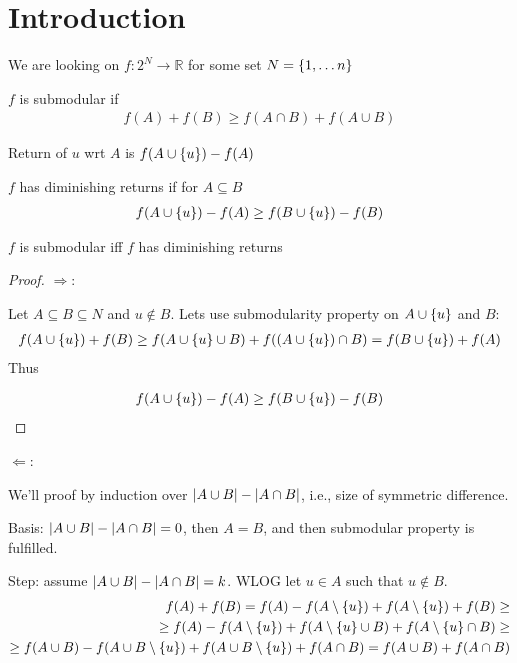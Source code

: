 \section{Introduction}
We are looking on $f: 2^N \to \mathbb{R}$ for some set $N = \qty{1, \dots n }$
\begin{definition}
	$f$ is submodular if 
	\begin{align}
	f(A)+f(B) \geq f(A\cap B) + f(A\cup B)
	\end{align}
\end{definition}

\begin{definition}
	Return of $u$ wrt $A$ is $f(A \cup \qty{u }) - f(A)$
	
\end{definition}
\begin{definition}
$f$ has diminishing returns if for $A\subseteq B$
\begin{align}
f(A \cup \qty{u }) - f(A) \geq f(B \cup \qty{u }) - f(B)
\end{align}
\end{definition}

\begin{prop}
	$f$ is submodular iff $f$ has diminishing returns
	\begin{proof}
		$\Rightarrow$:
		
		Let $A\subseteq B \subseteq N$ and $u\notin B$. Lets use submodularity property on $A\cup \qty{ u }$ and $B$:
		\begin{align}
		f(A\cup \qty{ u }) + f(B) \geq f\qty(A\cup \qty{ u } \cup B) + f\qty((A\cup \qty{ u }) \cap B)  = f\qty(B\cup \qty{ u }) + f(A)  
		\end{align}
		Thus
		
		\begin{align}
		f(A\cup \qty{ u })-f(A) \geq f\qty(B\cup \qty{ u })-f(B)
		\end{align}
	\end{proof}


$\Leftarrow$:

We'll proof by induction over $\abs{A\cup B} - \abs{A\cap B}$, i.e., size of symmetric difference.

Basis: $\abs{A\cup B} - \abs{A\cap B} = 0$, then $A=B$, and then submodular property is fulfilled.

Step: assume $\abs{A\cup B} - \abs{A\cap B} = k$. WLOG let $u\in A$ such that $u\notin B$.
\begin{align}
f(A) + f(B) = f(A) - f(A \setminus \qty{u}) + f(A \setminus  \qty{u}) + f(B) \geq\\\geq  f(A) - f(A \setminus \qty{u}) + f(A \setminus  \qty{u} \cup B) + f(A \setminus  \qty{u}  \cap B) \geq\\\geq f(A\cup B) -  f(A\cup B \setminus \qty{ u }) + f(A  \cup B \setminus  \qty{u} ) + f(A  \cap B) = f(A\cup B) + f(A\cap B)
\end{align}
\end{prop}

